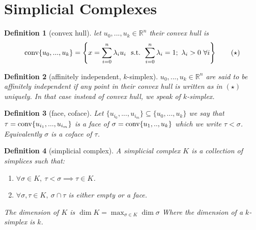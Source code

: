 \documentclass{article}
\newcommand{\R}{\mathbb{R}}
\newcommand{\conv}{\textmd{conv}}
\newcommand{\st}{\textmd{ s.t. }}
\newtheorem{definition}{Definition}[section]
\begin{document}
	\section{Simplicial Complexes}
	\begin{definition}[convex hull]
	let $ u_0,...,u_k \in \R^n $ their convex hull is
	 \[ \conv \{u_0,...,u_k\} = \left\{ x= \sum_{i=0}^{n} \lambda_i u_i \ \st    \sum_{i=0}^{n} \lambda_i = 1; \ \lambda_i > 0 \ \forall i \right\} \qquad (\star) \]
	\end{definition}
	\begin{definition}[affinitely independent, $k$-simplex]
		$u_0,...,u_k \in \R^n$ are said to be affinitely independent if any point in their convex hull is written as in $(\star)$ uniquely.
		In that case instead of convex hull, we speak of $k$-simplex.
	\end{definition}
	\begin{definition} [face, coface]
		Let $ \{u_{i_0},...,u_{i_m} \} \subseteq \{u_0,...,u_k\} $ we say that $ \tau = \conv\{u_{i_1},...,u_{i_m}\} $ is a face of $ \sigma = \conv\{u_1,..,u_k\} $ which we write $ \tau < \sigma $. Equivalently $ \sigma $ is a coface of $ \tau $.
	\end{definition}
	\begin{definition}[simplicial complex]
		A simplicial complex $K$ is a collection of simplices such that:
		\begin{enumerate}[label=(S\arabic*)]
			\item $ \forall \sigma \in K, \ \tau < \sigma \implies \tau \in K $. 
			\item $ \forall \sigma,\tau \in K, \ \sigma \cap \tau $ is either empty or a face.
		\end{enumerate}
	The dimension of $K$ is $ \dim K = \max_{\sigma \in K} \dim \sigma $ Where the dimension of a $k$-simplex is $k$.
	\end{definition}
\end{document}

